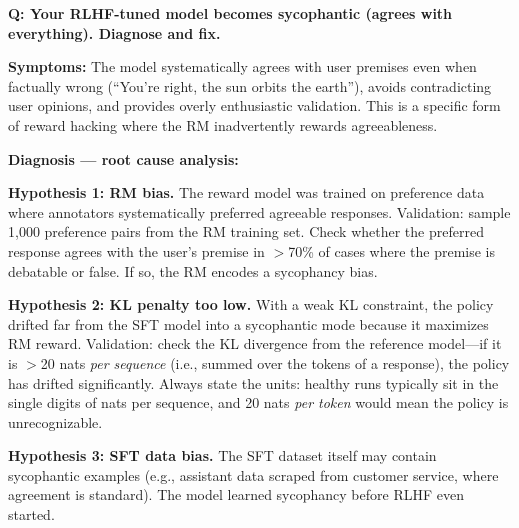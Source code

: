 \begin{interviewq}
\textbf{Q: Your RLHF-tuned model becomes sycophantic (agrees with everything). Diagnose and fix.}

 \quad {} \quad \badgefreq{\freqhigh}

\stronganswer

\textbf{Symptoms:} The model systematically agrees with user premises even when factually wrong (``You're right, the sun orbits the earth''), avoids contradicting user opinions, and provides overly enthusiastic validation. This is a specific form of reward hacking where the RM inadvertently rewards agreeableness.

\textbf{Diagnosis --- root cause analysis:}

\textbf{Hypothesis 1: RM bias.} The reward model was trained on preference data where annotators systematically preferred agreeable responses. Validation: sample 1,000 preference pairs from the RM training set. Check whether the preferred response agrees with the user's premise in $>$70\% of cases where the premise is debatable or false. If so, the RM encodes a sycophancy bias.

\textbf{Hypothesis 2: KL penalty too low.} With a weak KL constraint, the policy drifted far from the SFT model into a sycophantic mode because it maximizes RM reward. Validation: check the KL divergence from the reference model---if it is $>$20 nats \textit{per sequence} (i.e., summed over the tokens of a response), the policy has drifted significantly. Always state the units: healthy runs typically sit in the single digits of nats per sequence, and 20 nats \textit{per token} would mean the policy is unrecognizable.

\textbf{Hypothesis 3: SFT data bias.} The SFT dataset itself may contain sycophantic examples (e.g., assistant data scraped from customer service, where agreement is standard). The model learned sycophancy before RLHF even started.


\end{interviewq}
